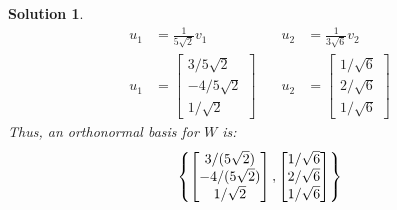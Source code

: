 \documentclass[11pt]{scrartcl}
\theoremstyle{dotlessP}
\newtheorem{sol}{Solution}[section]
\theoremstyle{dotlessN}
\DeclarePairedDelimiter\set{\{}{\}}
\begin{document}
\begin{sol}
\begin{align*}
		u_1 &= \frac{1}{5\sqrt{2}}v_1 &\quad u_2 &= \frac{1}{3\sqrt{6}}v_2 \\
		u_1 &=
		\begin{bmatrix}
			3/5\sqrt{2} \\
			-4/5\sqrt{2} \\
			1/\sqrt{2}
		\end{bmatrix} &\quad u_2 &=
		\begin{bmatrix}
			1/\sqrt{6} \\
			2/\sqrt{6} \\
			1/\sqrt{6}
		\end{bmatrix}
	\end{align*}
	Thus, an orthonormal basis for $W$ is:
	\[
		\set*{
		\begin{bmatrix}
			3/(5\sqrt{2}) \\
			-4/(5\sqrt{2}) \\
			1/\sqrt{2}
		\end{bmatrix},
		\begin{bmatrix}
			1/\sqrt{6} \\
			2/\sqrt{6} \\
			1/\sqrt{6}
	\end{bmatrix}}
	\] 
\end{sol}
\end{document}
